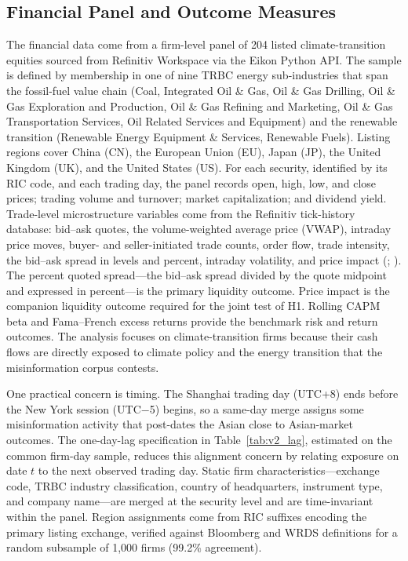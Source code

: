 \documentclass{article}
\theoremstyle{plain}
\begin{document}
\subsection{Financial Panel and Outcome Measures}
\label{sec:data_financial}

The financial data come from a firm-level panel of 204 listed climate-transition equities sourced from Refinitiv Workspace via the Eikon Python API. The sample is defined by membership in one of nine TRBC energy sub-industries that span the fossil-fuel value chain (Coal, Integrated Oil \& Gas, Oil \& Gas Drilling, Oil \& Gas Exploration and Production, Oil \& Gas Refining and Marketing, Oil \& Gas Transportation Services, Oil Related Services and Equipment) and the renewable transition (Renewable Energy Equipment \& Services, Renewable Fuels). Listing regions cover China (CN), the European Union (EU), Japan (JP), the United Kingdom (UK), and the United States (US). For each security, identified by its RIC code, and each trading day, the panel records open, high, low, and close prices; trading volume and turnover; market capitalization; and dividend yield. Trade-level microstructure variables come from the Refinitiv tick-history database: bid--ask quotes, the volume-weighted average price (VWAP), intraday price moves, buyer- and seller-initiated trade counts, order flow, trade intensity, the bid--ask spread in levels and percent, intraday volatility, and price impact (\cite{Karpoff1987}; \cite{Parkinson1980}). The percent quoted spread---the bid--ask spread divided by the quote midpoint and expressed in percent---is the primary liquidity outcome. Price impact is the companion liquidity outcome required for the joint test of H1. Rolling CAPM beta and Fama--French excess returns provide the benchmark risk and return outcomes. The analysis focuses on climate-transition firms because their cash flows are directly exposed to climate policy and the energy transition that the misinformation corpus contests.

One practical concern is timing. The Shanghai trading day (UTC+8) ends before the New York session (UTC$-$5) begins, so a same-day merge assigns some misinformation activity that post-dates the Asian close to Asian-market outcomes. The one-day-lag specification in Table~\ref{tab:v2_lag}, estimated on the common firm-day sample, reduces this alignment concern by relating exposure on date $t$ to the next observed trading day. Static firm characteristics---exchange code, TRBC industry classification, country of headquarters, instrument type, and company name---are merged at the security level and are time-invariant within the panel. Region assignments come from RIC suffixes encoding the primary listing exchange, verified against Bloomberg and WRDS definitions for a random subsample of 1,000 firms (99.2\% agreement).
\end{document}
